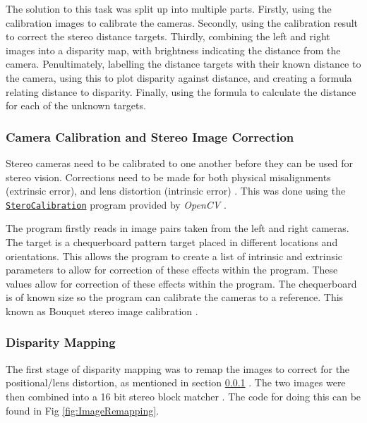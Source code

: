 \documentclass[conference]{IEEEtran}
\begin{document}
The solution to this task was split up into multiple parts. Firstly, using the calibration images to calibrate the cameras. Secondly, using the calibration result to correct the stereo distance targets. Thirdly, combining the left and right images into a disparity map, with brightness indicating the distance from the camera. Penultimately, labelling the distance targets with their known distance to the camera, using this to plot disparity against distance, and creating a formula relating distance to disparity. Finally, using the formula to calculate the distance for each of the unknown targets.

\subsubsection{Camera Calibration and Stereo Image Correction} \label{Camera_Calibration}

Stereo cameras need to be calibrated to one another before they can be used for stereo vision. Corrections need to be made for both physical misalignments (extrinsic error), and lens distortion (intrinsic error) \cite{Stero_Calibration}. This was done using the \href{https://docs.opencv.org/2.4/modules/calib3d/doc/camera_calibration_and_3d_reconstruction.html?highlight=stereocalibration}{\texttt{SteroCalibration}} program provided by \textit{OpenCV} \cite{Book_Calibration}.

The program firstly reads in image pairs taken from the left and right cameras. The target is a chequerboard pattern target placed in different locations and orientations. This allows the program to create a list of intrinsic and extrinsic parameters to allow for correction of these effects within the program. These values allow for correction of these effects within the program. The chequerboard is of known size so the program can calibrate the cameras to a reference. This known as Bouquet stereo image calibration \cite{Bouget}.

\subsubsection{Disparity Mapping} \label{Disparity_Mapping}

The first stage of disparity mapping was to remap the images to correct for the positional/lens distortion, as mentioned in section \ref{Camera_Calibration} \cite{OpenCV_Remapping}. The two images were then combined into a 16 bit stereo block matcher \cite{Stereo_Block_Matching}. The code for doing this can be found in Fig \ref{fig:ImageRemapping}.
\end{document}
